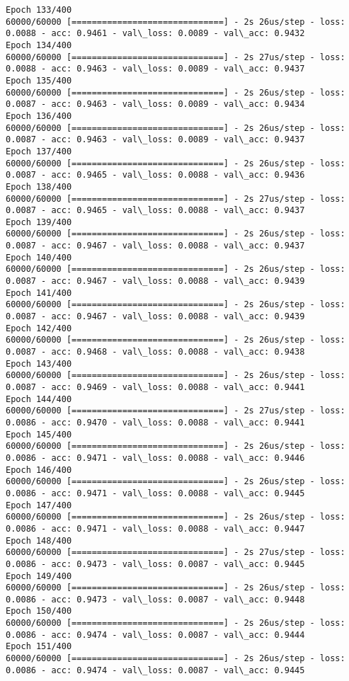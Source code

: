 \documentclass[11pt]{article}
\begin{document}
\begin{Verbatim}[commandchars=\\\{\}]
Epoch 133/400
60000/60000 [==============================] - 2s 26us/step - loss: 0.0088 - acc: 0.9461 - val\_loss: 0.0089 - val\_acc: 0.9432
Epoch 134/400
60000/60000 [==============================] - 2s 27us/step - loss: 0.0088 - acc: 0.9463 - val\_loss: 0.0089 - val\_acc: 0.9437
Epoch 135/400
60000/60000 [==============================] - 2s 26us/step - loss: 0.0087 - acc: 0.9463 - val\_loss: 0.0089 - val\_acc: 0.9434
Epoch 136/400
60000/60000 [==============================] - 2s 26us/step - loss: 0.0087 - acc: 0.9463 - val\_loss: 0.0089 - val\_acc: 0.9437
Epoch 137/400
60000/60000 [==============================] - 2s 26us/step - loss: 0.0087 - acc: 0.9465 - val\_loss: 0.0088 - val\_acc: 0.9436
Epoch 138/400
60000/60000 [==============================] - 2s 27us/step - loss: 0.0087 - acc: 0.9465 - val\_loss: 0.0088 - val\_acc: 0.9437
Epoch 139/400
60000/60000 [==============================] - 2s 26us/step - loss: 0.0087 - acc: 0.9467 - val\_loss: 0.0088 - val\_acc: 0.9437
Epoch 140/400
60000/60000 [==============================] - 2s 26us/step - loss: 0.0087 - acc: 0.9467 - val\_loss: 0.0088 - val\_acc: 0.9439
Epoch 141/400
60000/60000 [==============================] - 2s 26us/step - loss: 0.0087 - acc: 0.9467 - val\_loss: 0.0088 - val\_acc: 0.9439
Epoch 142/400
60000/60000 [==============================] - 2s 26us/step - loss: 0.0087 - acc: 0.9468 - val\_loss: 0.0088 - val\_acc: 0.9438
Epoch 143/400
60000/60000 [==============================] - 2s 26us/step - loss: 0.0087 - acc: 0.9469 - val\_loss: 0.0088 - val\_acc: 0.9441
Epoch 144/400
60000/60000 [==============================] - 2s 27us/step - loss: 0.0086 - acc: 0.9470 - val\_loss: 0.0088 - val\_acc: 0.9441
Epoch 145/400
60000/60000 [==============================] - 2s 26us/step - loss: 0.0086 - acc: 0.9471 - val\_loss: 0.0088 - val\_acc: 0.9446
Epoch 146/400
60000/60000 [==============================] - 2s 26us/step - loss: 0.0086 - acc: 0.9471 - val\_loss: 0.0088 - val\_acc: 0.9445
Epoch 147/400
60000/60000 [==============================] - 2s 26us/step - loss: 0.0086 - acc: 0.9471 - val\_loss: 0.0088 - val\_acc: 0.9447
Epoch 148/400
60000/60000 [==============================] - 2s 27us/step - loss: 0.0086 - acc: 0.9473 - val\_loss: 0.0087 - val\_acc: 0.9445
Epoch 149/400
60000/60000 [==============================] - 2s 26us/step - loss: 0.0086 - acc: 0.9473 - val\_loss: 0.0087 - val\_acc: 0.9448
Epoch 150/400
60000/60000 [==============================] - 2s 26us/step - loss: 0.0086 - acc: 0.9474 - val\_loss: 0.0087 - val\_acc: 0.9444
Epoch 151/400
60000/60000 [==============================] - 2s 26us/step - loss: 0.0086 - acc: 0.9474 - val\_loss: 0.0087 - val\_acc: 0.9445

\end{Verbatim}
\end{document}
